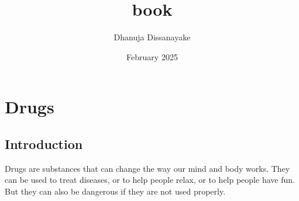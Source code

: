\documentclass[12pt, a4paper, twoside]{book}
\title{book}
\author{Dhanuja Dissanayake }
\date{February 2025}
\begin{document}
\maketitle

\chapter{Drugs}

\section{Introduction}  

Drugs are substances that can change the way our mind and body works. They can be used to treat diseases, or to help people relax, or to help people have fun. But they can also be dangerous if they are not used properly.
\end{document}
